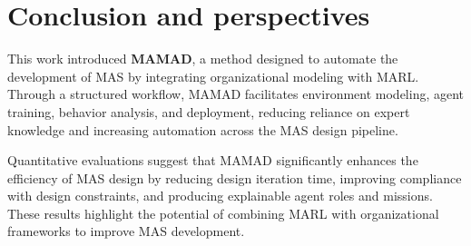 \documentclass[pdflatex,sn-mathphys-num]{sn-jnl}%
\theoremstyle{thmstyleone}%
\theoremstyle{thmstyletwo}%
\theoremstyle{thmstylethree}%
\begin{document}
\section{Conclusion and perspectives}\label{sec:conclusion}

This work introduced \textbf{MAMAD}, a method designed to automate the development of MAS by integrating organizational modeling with MARL. Through a structured workflow, MAMAD facilitates environment modeling, agent training, behavior analysis, and deployment, reducing reliance on expert knowledge and increasing automation across the MAS design pipeline. 

Quantitative evaluations suggest that MAMAD significantly enhances the efficiency of MAS design by reducing design iteration time, improving compliance with design constraints, and producing explainable agent roles and missions. These results highlight the potential of combining MARL with organizational frameworks to improve MAS development.
\end{document}
